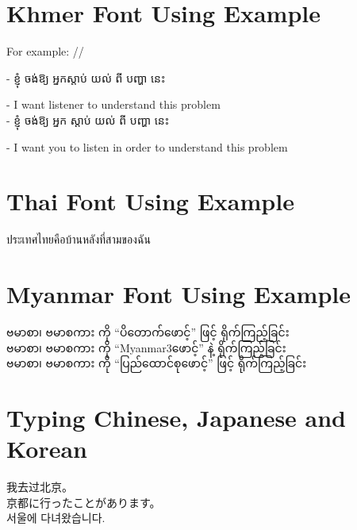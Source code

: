 \documentclass[12pt]{article}
\newcommand{\quotes}[1]{``#1''}
\begin{document}
\section*{Khmer Font Using Example}

For example: //

{\kh - \small{ខ្ញុំ ចង់ឱ្យ \textlangle{} អ្នកស្តាប់ \textrangle{} យល់ ពី បញ្ហា នេះ}}

- I want listener to understand this problem\\

{\kh - \small{ខ្ញុំ ចង់ឱ្យ \textlangle{} អ្នក \textrangle{} \textlangle{} ស្តាប់ \textrangle{} យល់ ពី បញ្ហា នេះ}}

- I want you to listen in order to understand this problem\\

\section*{Thai Font Using Example}

{\thaitext ประเทศไทยคือบ้านหลังที่สามของฉัน}

\section*{Myanmar Font Using Example}

{\padauktext ဗမာစာ၊ ဗမာစကား ကို} \quotes{{\padauktext ပိတောက်ဖောင့်}} {\padauktext ဖြင့် ရိုက်ကြည့်ခြင်း}\\
{\myanmartext ဗမာစာ၊ ဗမာစကား ကို} \quotes{{\padauktext Myanmar3ဖောင့်}}  {\padauktext နဲ့ ရိုက်ကြည့်ခြင်း}\\
{\pdstext ဗမာစာ၊ ဗမာစကား ကို} \quotes{{\padauktext ပြည်ထောင်စုဖောင့်}} {\padauktext ဖြင့် ရိုက်ကြည့်ခြင်း}\\

\section*{Typing Chinese, Japanese and Korean}

我去过北京。\\
京都に行ったことがあります。\\
서울에 다녀왔습니다. \\
\end{document}
